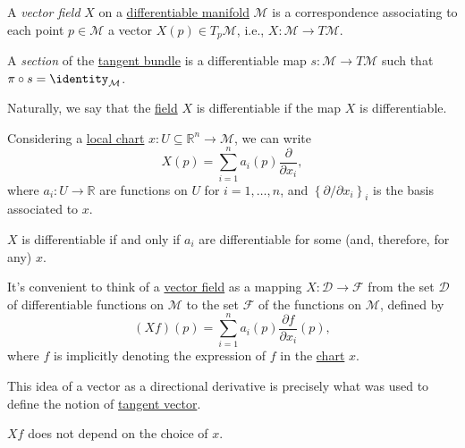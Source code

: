 \begin{definition}\label{def:vector-field}
	A \emph{vector field} \(X\) on a \hyperref[def:smooth-manifold]{differentiable manifold} \(\mathcal{M} \) is a correspondence associating to each point \(p\in \mathcal{M} \) a vector \(X(p)\in T_p \mathcal{M} \), i.e., \(X\colon \mathcal{M} \to T\mathcal{M} \).
\end{definition}

\begin{definition}[Section]\label{def:section}
	A \emph{section} of the \hyperref[def:tangent-bundle]{tangent bundle} is a differentiable map \(s\colon \mathcal{M} \to T \mathcal{M}\) such that \(\pi \circ s =\identity_{\mathcal{M} } \).
\end{definition}

\begin{remark}
	Naturally, we say that the \hyperref[def:vector-field]{field} \(X\) is differentiable if the map \(X\) is differentiable.
\end{remark}

Considering a \hyperref[def:coordinate-chart]{local chart} \(x\colon U \subseteq \mathbb{R} ^n \to \mathcal{M} \), we can write
\[
	X(p) = \sum_{i=1}^{n} a_i(p) \frac{\partial }{\partial x_i},
\]
where \(a_i\colon U \to \mathbb{R} \) are functions on \(U\) for \(i = 1, \ldots , n\), and \(\left\{ \partial / \partial x_i \right\}_{i} \) is the basis associated to \(x\).

\begin{remark}
	\(X\) is differentiable if and only if \(a_i\) are differentiable for some (and, therefore, for any) \(x\).
\end{remark}

It's convenient to think of a \hyperref[def:vector-field]{vector field} as a mapping \(X\colon \mathcal{D} \to \mathcal{F} \) from the set \(\mathcal{D} \) of differentiable functions on \(\mathcal{M} \) to the set \(\mathcal{F} \) of the functions on \(\mathcal{M} \), defined by
\[
	(Xf)(p) = \sum_{i=1}^{n} a_i(p)\frac{\partial f}{\partial x_i} (p),
\]
where \(f\) is implicitly denoting the expression of \(f\) in the \hyperref[def:coordinate-chart]{chart} \(x\).

\begin{intuition}
	This idea of a vector as a directional derivative is precisely what was used to define the notion of \hyperref[def:tangent-vector]{tangent vector}.
\end{intuition}

\begin{remark}
	\(Xf\) does not depend on the choice of \(x\).
\end{remark}

